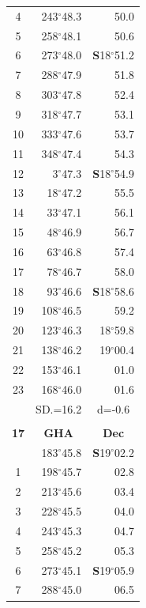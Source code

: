 \documentclass[10pt, a4paper]{report}
\begin{document}
\begin{scriptsize}
\begin{tabular*}{0.2\textwidth}[t]{@{\extracolsep{\fill}}|c|rr|}
4 & 243$^\circ$48.3 & 50.0\\
5 & 258$^\circ$48.1 & 50.6\\[2Pt]
6 & 273$^\circ$48.0 & \textbf{S}18$^\circ$51.2\\
7 & 288$^\circ$47.9 & 51.8\\
8 & 303$^\circ$47.8 & 52.4\\
9 & 318$^\circ$47.7 & \raisebox{0.24ex}{\boldmath$\cdot$~\boldmath$\cdot$~~}53.1\\
10 & 333$^\circ$47.6 & 53.7\\
11 & 348$^\circ$47.4 & 54.3\\[2Pt]
12 & 3$^\circ$47.3 & \textbf{S}18$^\circ$54.9\\
13 & 18$^\circ$47.2 & 55.5\\
14 & 33$^\circ$47.1 & 56.1\\
15 & 48$^\circ$46.9 & \raisebox{0.24ex}{\boldmath$\cdot$~\boldmath$\cdot$~~}56.7\\
16 & 63$^\circ$46.8 & 57.4\\
17 & 78$^\circ$46.7 & 58.0\\[2Pt]
18 & 93$^\circ$46.6 & \textbf{S}18$^\circ$58.6\\
19 & 108$^\circ$46.5 & 59.2\\
20 & 123$^\circ$46.3 & 18$^\circ$59.8\\
21 & 138$^\circ$46.2 & 19$^\circ$00.4\\
22 & 153$^\circ$46.1 & 01.0\\
23 & 168$^\circ$46.0 & 01.6\\
\hline
\rule{0pt}{2.4ex} & \multicolumn{1}{c}{SD.=16.2} & \multicolumn{1}{c|}{d=-0.6}\\
\hline
\multicolumn{1}{c}{}\\[-0.5ex]\hline
\multicolumn{1}{|c|}{\rule{0pt}{2.6ex}\textbf{17}} & \multicolumn{1}{c}{\textbf{GHA}} & \multicolumn{1}{c|}{\textbf{Dec}}\\
\hline\rule{0pt}{2.6ex}\noindent
0 & 183$^\circ$45.8 & \textbf{S}19$^\circ$02.2\\
1 & 198$^\circ$45.7 & 02.8\\
2 & 213$^\circ$45.6 & 03.4\\
3 & 228$^\circ$45.5 & \raisebox{0.24ex}{\boldmath$\cdot$~\boldmath$\cdot$~~}04.0\\
4 & 243$^\circ$45.3 & 04.7\\
5 & 258$^\circ$45.2 & 05.3\\[2Pt]
6 & 273$^\circ$45.1 & \textbf{S}19$^\circ$05.9\\
7 & 288$^\circ$45.0 & 06.5\\

\end{tabular*}
\end{scriptsize}
\end{document}
